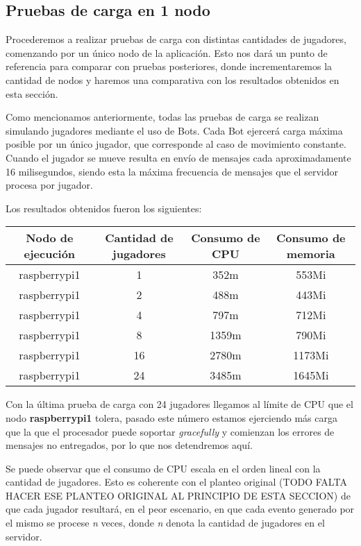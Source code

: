 \subsection{Pruebas de carga en 1 nodo}

\noindent Procederemos a realizar pruebas de carga con distintas cantidades de jugadores, comenzando por un único nodo de la aplicación. Esto
nos dará un punto de referencia para comparar con pruebas posteriores, donde incrementaremos la cantidad de nodos y haremos una comparativa con los resultados
obtenidos en esta sección.

Como mencionamos anteriormente, todas las pruebas de carga se realizan simulando jugadores mediante el uso de Bots. Cada Bot ejercerá carga máxima posible por un único jugador, que corresponde
al caso de movimiento constante. Cuando el jugador se mueve resulta en envío de mensajes cada aproximadamente 16 milisegundos, siendo esta la máxima frecuencia de mensajes que el servidor
procesa por jugador.

Los resultados obtenidos fueron los siguientes:

\begin{center}
\begin{tabular}{|c|c|c|c|}
    \hline
    \textbf{Nodo de ejecución} & \textbf{Cantidad de jugadores} & \textbf{Consumo de CPU} & \textbf{Consumo de memoria} \\
    \hline
    raspberrypi1 & 1 & 352m & 553Mi \\
    \hline
    raspberrypi1 & 2 & 488m & 443Mi \\
    \hline
    raspberrypi1 & 4 & 797m & 712Mi \\
    \hline
    raspberrypi1 & 8 & 1359m & 790Mi \\
    \hline
    raspberrypi1 & 16 & 2780m & 1173Mi \\
    \hline
    raspberrypi1 & 24 & 3485m & 1645Mi \\
    \hline
\end{tabular}
\end{center}

Con la última prueba de carga con 24 jugadores llegamos al límite de CPU que el nodo \textbf{raspberrypi1} tolera, pasado este número estamos ejerciendo más carga que la que el procesador
puede soportar \textit{gracefully} y comienzan los errores de mensajes no entregados, por lo que nos detendremos aquí. 

Se puede observar que el consumo de CPU escala en el orden lineal con la cantidad de jugadores. Esto es coherente con el planteo original (TODO FALTA HACER ESE PLANTEO ORIGINAL AL PRINCIPIO DE ESTA SECCION)
de que cada jugador resultará, en el peor escenario, en que cada evento generado por el mismo se procese \textit{n} veces, donde \textit{n} denota la cantidad de jugadores en el servidor.

